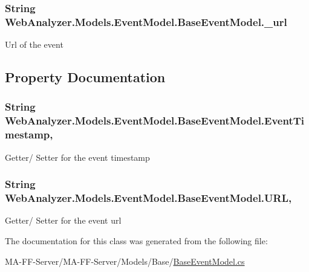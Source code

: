 \subsubsection[{\+\_\+url}]{\setlength{\rightskip}{0pt plus 5cm}String Web\+Analyzer.\+Models.\+Event\+Model.\+Base\+Event\+Model.\+\_\+url\hspace{0.3cm}{\ttfamily [protected]}}\label{class_web_analyzer_1_1_models_1_1_event_model_1_1_base_event_model_a8cfc8644deaf4edfec7fcd7f08dfa20c}


Url of the event 



\subsection{Property Documentation}
\hypertarget{class_web_analyzer_1_1_models_1_1_event_model_1_1_base_event_model_ae6d980edbc758b7c413181778d79af3b}{}
\subsubsection[{Event\+Timestamp}]{\setlength{\rightskip}{0pt plus 5cm}String Web\+Analyzer.\+Models.\+Event\+Model.\+Base\+Event\+Model.\+Event\+Timestamp\hspace{0.3cm}{\ttfamily [get]}, {\ttfamily [set]}}\label{class_web_analyzer_1_1_models_1_1_event_model_1_1_base_event_model_ae6d980edbc758b7c413181778d79af3b}


Getter/ Setter for the event timestamp 

\hypertarget{class_web_analyzer_1_1_models_1_1_event_model_1_1_base_event_model_a328a729d379e64c2007b70e828c95adb}{}
\subsubsection[{U\+R\+L}]{\setlength{\rightskip}{0pt plus 5cm}String Web\+Analyzer.\+Models.\+Event\+Model.\+Base\+Event\+Model.\+U\+R\+L\hspace{0.3cm}{\ttfamily [get]}, {\ttfamily [set]}}\label{class_web_analyzer_1_1_models_1_1_event_model_1_1_base_event_model_a328a729d379e64c2007b70e828c95adb}


Getter/ Setter for the event url 



The documentation for this class was generated from the following file\+:\begin{DoxyCompactItemize}
\item 
M\+A-\/\+F\+F-\/\+Server/\+M\+A-\/\+F\+F-\/\+Server/\+Models/\+Base/\hyperlink{_base_event_model_8cs}{Base\+Event\+Model.\+cs}\end{DoxyCompactItemize}
